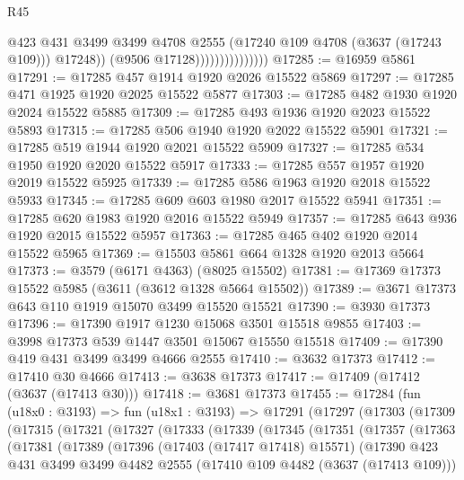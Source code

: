 \begin{lexlean}{R45}
\begin{coremodule}
                                    @423
                                    @431
                                    @3499
                                    @3499
                                    @4708
                                    @2555
                                    (@17240 @109 @4708 (@3637 (@17243 @109)))
                                    @17248))
                                (@9506 @17128)))))))))))))))
@17285 := @16959 @5861
@17291 := @17285 @457 @1914 @1920 @2026 @15522 @5869
@17297 := @17285 @471 @1925 @1920 @2025 @15522 @5877
@17303 := @17285 @482 @1930 @1920 @2024 @15522 @5885
@17309 := @17285 @493 @1936 @1920 @2023 @15522 @5893
@17315 := @17285 @506 @1940 @1920 @2022 @15522 @5901
@17321 := @17285 @519 @1944 @1920 @2021 @15522 @5909
@17327 := @17285 @534 @1950 @1920 @2020 @15522 @5917
@17333 := @17285 @557 @1957 @1920 @2019 @15522 @5925
@17339 := @17285 @586 @1963 @1920 @2018 @15522 @5933
@17345 := @17285 @609 @603 @1980 @2017 @15522 @5941
@17351 := @17285 @620 @1983 @1920 @2016 @15522 @5949
@17357 := @17285 @643 @936 @1920 @2015 @15522 @5957
@17363 := @17285 @465 @402 @1920 @2014 @15522 @5965
@17369 := @15503 @5861 @664 @1328 @1920 @2013 @5664
@17373 := @3579 (@6171 @4363) (@8025 @15502)
@17381 := @17369 @17373 @15522 @5985 (@3611 (@3612 @1328 @5664 @15502))
@17389 := @3671 @17373 @643 @110 @1919 @15070 @3499 @15520 @15521
@17390 := @3930 @17373
@17396 := @17390 @1917 @1230 @15068 @3501 @15518 @9855
@17403 := @3998 @17373 @539 @1447 @3501 @15067 @15550 @15518
@17409 := @17390 @419 @431 @3499 @3499 @4666 @2555
@17410 := @3632 @17373
@17412 := @17410 @30 @4666
@17413 := @3638 @17373
@17417 := @17409 (@17412 (@3637 (@17413 @30)))
@17418 := @3681 @17373
@17455 := @17284
    (fun (u18x0 : @3193) =>
    fun (u18x1 : @3193) =>
    @17291
      (@17297
        (@17303
          (@17309
            (@17315
              (@17321
                (@17327
                  (@17333
                    (@17339
                      (@17345
                        (@17351
                          (@17357
                            (@17363
                              (@17381
                                (@17389
                                  (@17396
                                    (@17403 (@17417 @17418) @15571)
                                    (@17390
                                      @423
                                      @431
                                      @3499
                                      @3499
                                      @4482
                                      @2555
                                      (@17410 @109 @4482 (@3637 (@17413 @109)))

\end{coremodule}
\end{lexlean}
